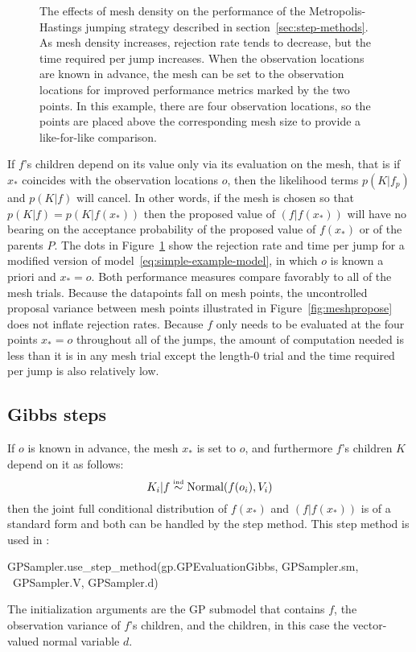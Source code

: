 \documentclass[article]{jss}
\begin{document}
\begin{figure}
    \centering
    \caption{The effects of mesh density on the performance of the Metropolis-Hastings jumping strategy described in section~\ref{sec:step-methods}. As mesh density increases, rejection rate tends to decrease, but the time required per jump increases. When the observation locations are known in advance, the mesh can be set to the observation locations for improved performance metrics marked by the two points. In this example, there are four observation locations, so the points are placed above the corresponding mesh size to provide a like-for-like comparison.}
    \label{fig:meshchoice}
\end{figure}

If $f$'s children depend on its value only via its evaluation on the mesh, that is if $x_*$ coincides with the observation locations $o$, then the likelihood terms $p(K|f_p)$ and $p(K|f)$ will cancel. In other words, if the mesh is chosen so that $p(K|f)=p(K|f(x_*))$ then the proposed value of $(f|f(x_*))$ will have no bearing on the acceptance probability of the proposed value of $f(x_*)$ or of the parents $P$. The dots in Figure~\ref{fig:meshchoice} show the rejection rate and time per jump for a modified version of model~\ref{eq:simple-example-model}, in which $o$ is known a priori and $x_*=o$. Both performance measures compare favorably to all of the mesh trials. Because the datapoints fall on mesh points, the uncontrolled proposal variance between mesh points illustrated in Figure~\ref{fig:meshpropose} does not inflate rejection rates. Because $f$ only needs to be evaluated at the four points $x_*=o$ throughout all of the jumps, the amount of computation needed is less than it is in any mesh trial except the length-0 trial and the time required per jump is also relatively low.

\subsection{Gibbs steps} 
\label{sec:gp-gibbs} 
If $o$ is known in advance, the mesh $x_*$ is set to $o$, and furthermore $f$'s children $K$ depend on it as follows:
\begin{equation}
    \label{eq:gibbs-criterion} 
    K_i|f \stackrel{\textup{\tiny ind}}{\sim} \textup{Normal}(f(o_i),V_i)
\end{equation}
then the joint full conditional distribution of $f(x_*)$ and $(f|f(x_*))$ is of a standard form and both can be handled by the  step method. This step method is used in :
\begin{CodeChunk}
\begin{CodeInput}
GPSampler.use_step_method(gp.GPEvaluationGibbs, GPSampler.sm, \
    GPSampler.V, GPSampler.d)
\end{CodeInput}
\end{CodeChunk}
The initialization arguments are the GP submodel that contains $f$, the observation variance of $f$'s children, and the children, in this case the vector-valued normal variable $d$. 
\end{document}

